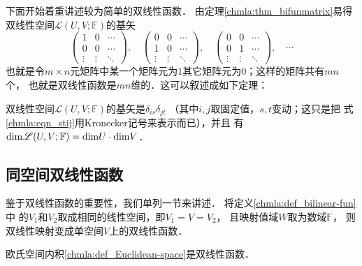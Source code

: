 下面开始着重讲述较为简单的双线性函数．
由定理\ref{chmla:thm_bifunmatrix}易得双线性空间$\mathscr{L}(U,V;\mathbb{F})$的基矢
\begin{equation}\label{chmla:eqn_stij}
    \begin{pmatrix}
        1 & 0& \cdots  \\
        0 & 0& \cdots \\
        \vdots & \vdots & \ddots
    \end{pmatrix},\quad
    \begin{pmatrix}
    0 & 0& \cdots  \\
    1 & 0& \cdots \\
    \vdots & \vdots & \ddots
\end{pmatrix},\quad
    \begin{pmatrix}
    0 & 0& \cdots  \\
    0 & 1& \cdots \\
    \vdots & \vdots & \ddots
\end{pmatrix},\quad \cdots
\end{equation}
也就是令$m\times n$元矩阵中某一个矩阵元为$1$其它矩阵元为$0$；这样的矩阵共有$mn$个，
也就是双线性函数是$mn$维的．这可以叙述成如下定理：
\begin{theorem}\label{chmla:thm_uvwd}
双线性空间$\mathscr{L}(U,V;\mathbb{F})$的基矢是$\delta_{is} \delta_{jt} $
（其中$i,j$取固定值，$s,t$变动；这只是把
式\eqref{chmla:eqn_stij}用Kronecker记号来表示而已），并且
有${\rm dim} \mathscr{L}(U,V;\mathbb{F}) = {\rm dim}U \cdot {\rm dim}V $．
\end{theorem}




\subsection{同空间双线性函数}\label{chmla:sec_double-linear-function}
鉴于双线性函数的重要性，我们单列一节来讲述．
将定义\ref{chmla:def_bilinear-fun}中
的$V_1$和$V_2$取成相同的线性空间，即$V_1 = V =V_2$，
且映射值域$W$取为数域$\mathbb{F}$，
则双线性映射变成单空间$V$上的双线性函数．

\begin{example}
    欧氏空间内积\ref{chmla:def_Euclidean-space}是双线性函数．
\end{example}

